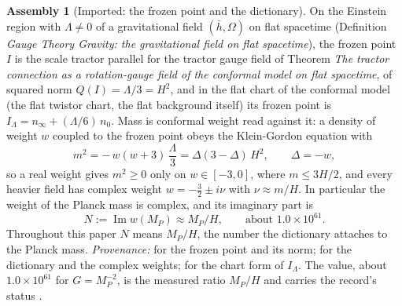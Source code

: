 \documentclass[11pt]{article}
\theoremstyle{definition}
\newtheorem{assembled}[theorem]{Assembly}
\theoremstyle{plain}
\newcommand{\changedmark}[2]{\marginpar{\raggedright\scriptsize\color{#1}#2}}
\providecommand{\hb}{}\renewcommand{\hb}{\bar{h}}
\begin{document}
\begin{assembled}[Imported: the frozen point and the dictionary]\label{c:standard-model.imported-frozen-point-dictionary}
\changedmark{BrickRed}{corrected since the deposit}
On the Einstein region with $\Lambda \neq 0$ of a gravitational field $(\hb, \Omega)$ on flat spacetime (Definition \emph{Gauge Theory Gravity: the gravitational field on flat spacetime}), the frozen point $I$ is the scale tractor parallel for the tractor gauge field of Theorem \emph{The tractor connection as a rotation-gauge field of the conformal model on flat spacetime}, of squared norm $Q(I) = \Lambda/3 = H^{2}$, and in the flat chart of the conformal model (the flat twistor chart, the flat background itself) its frozen point is $I_{\Lambda} = n_{\infty} + (\Lambda/6)\,n_{0}$. Mass is conformal weight read against it: a density of weight $w$ coupled to the frozen point obeys the Klein-Gordon equation with
\[
m^{2} = -\,w(w+3)\,\frac{\Lambda}{3} = \Delta(3-\Delta)\,H^{2}, \qquad \Delta = -w,
\]
so a real weight gives $m^{2} \ge 0$ only on $w \in [-3, 0]$, where $m \le 3H/2$, and every heavier field has complex weight $w = -\tfrac32 \pm i\nu$ with $\nu \approx m/H$. In particular the weight of the Planck mass is complex, and its imaginary part is
\[
N := \operatorname{Im} w(M_{P}) \approx M_{P}/H, \qquad\text{about } 1.0 \times 10^{61}.
\]
Throughout this paper $N$ means $M_{P}/H$, the number the dictionary attaches to the Planck mass. \emph{Provenance:} \cite[Thms.~4.5, 4.7]{ButlerT6} for the frozen point and its norm; \cite[Thm.~3.1, Cor.~3.2]{ButlerT11} for the dictionary and the complex weights; \cite[Lem.~5.1]{ButlerT11} for the chart form of $I_{\Lambda}$. The value, about $1.0 \times 10^{61}$ for $G = M_{P}^{-2}$, is the measured ratio $M_{P}/H$ and carries the record's status \cite{PDG2024}.
\end{assembled}
\end{document}
